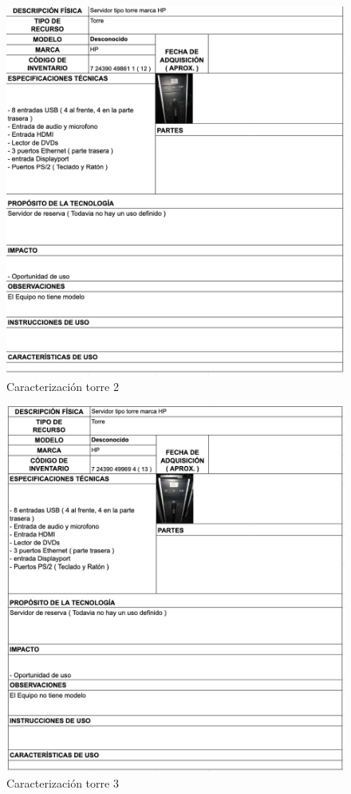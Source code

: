 \begin{figure}[H]
    \centering
    \includegraphics[width=\textwidth] {tablas-images/cp1/torres/torre-2.png}
    \caption{Caracterización torre 2}\label{fig:torre-2}
\end{figure}

\begin{figure}[H]
    \centering
    \includegraphics[width=\textwidth] {tablas-images/cp1/torres/torre-3.png}
    \caption{Caracterización torre 3}\label{fig:torre-3}
\end{figure}

